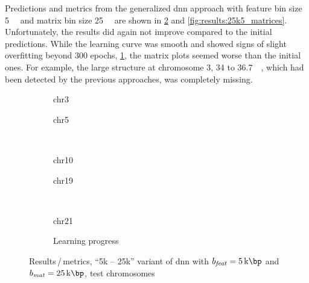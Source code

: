 Predictions and metrics from the generalized \acrshort{dnn} approach with feature bin size \SI{5}{\kilo\bp} and matrix bin size \SI{25}{\kilo\bp}
are shown in \cref{fig:results:25k5DNN_pearson} and \ref{fig:results:25k5_matrices}.
Unfortunately, the results did again not improve compared to the initial predictions.
While the learning curve was smooth and showed signs of slight overfitting beyond 300 epochs, \cref{fig:results:25k5DNN_lossEpochs},
the matrix plots seemed worse than the initial ones. 
For example, the large structure at chromosome 3, 34 to \SI{36.7}{\kilo\bp}, which had been detected by the previous approaches, was completely missing.
\begin{figure}[p]%
    \begin{subfigure}{0.45\textwidth}
        \scriptsize
        \caption{chr3}
    \end{subfigure} \hfill
    \begin{subfigure}{0.45\textwidth}
        \scriptsize
        \caption{chr5}
    \end{subfigure}\\[5mm]
    \begin{subfigure}{0.45\textwidth}
        \scriptsize
        \caption{chr10}
    \end{subfigure}\hfill
    \begin{subfigure}{0.45\textwidth}
        \scriptsize
        \caption{chr19}
    \end{subfigure}\\[3mm]
    \centering
    \begin{subfigure}{0.45\textwidth}
        \scriptsize
        \caption{chr21}
    \end{subfigure}\hfill
    \begin{subfigure}{0.45\textwidth}
        \caption{Learning progress} \label{fig:results:25k5DNN_lossEpochs}
    \end{subfigure}
    \caption{Results\,/\,metrics, ``5k -- 25k'' variant of \acrshort{dnn} with $b_\mathit{feat}=\SI{5}{\kilo\bp}$ and $b_\mathit{mat}=\SI{25}{\kilo\bp}$,  test chromosomes}
    \label{fig:results:25k5DNN_pearson}
\end{figure}
